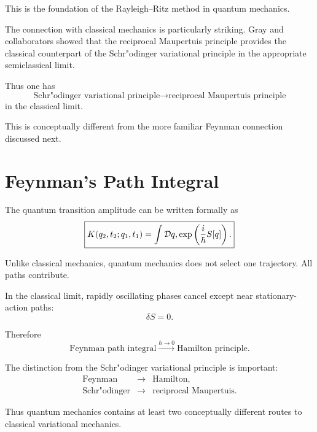 This is the foundation of the Rayleigh--Ritz method in quantum mechanics.

The connection with classical mechanics is particularly striking.  Gray and collaborators showed that the reciprocal Maupertuis principle provides the classical counterpart of the Schr"odinger variational principle in the appropriate semiclassical limit.

Thus one has
\begin{equation}
\boxed{
\text{Schr"odinger variational principle}
\longrightarrow
\text{reciprocal Maupertuis principle}
}
\end{equation}
in the classical limit.

This is conceptually different from the more familiar Feynman connection discussed next.

\section{Feynman's Path Integral}

The quantum transition amplitude can be written formally as
\begin{equation}
\boxed{
K(q_2,t_2;q_1,t_1)
=
\int{\cal D}q,
\exp\left(\frac{i}{\hbar}S[q]\right).
}
\label{eq:feynman}
\end{equation}

Unlike classical mechanics, quantum mechanics does not select one trajectory.  All paths contribute.

In the classical limit, rapidly oscillating phases cancel except near stationary-action paths:
\begin{equation}
\delta S=0.
\end{equation}

Therefore
\begin{equation}
\boxed{
\text{Feynman path integral}
\overset{\hbar\rightarrow0}{\longrightarrow}
\text{Hamilton principle}.
}
\end{equation}

The distinction from the Schr"odinger variational principle is important:
\begin{equation}
\boxed{
\begin{array}{ccc}
\text{Feynman}
&\longrightarrow&
\text{Hamilton},\\
\text{Schr"odinger}
&\longrightarrow&
\text{reciprocal Maupertuis}.
\end{array}}
\end{equation}

Thus quantum mechanics contains at least two conceptually different routes to classical variational mechanics.

